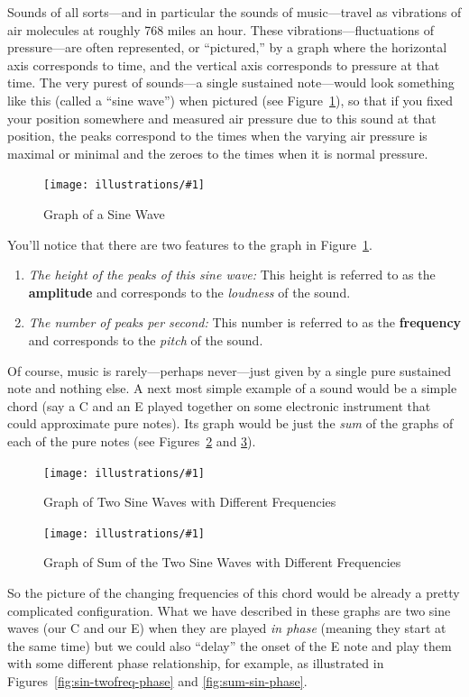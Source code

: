 \documentclass[openany]{book}
\newcommand{\ill}[3]{%
   \begin{figure}[H]%
   \vspace{-2ex}
   \centering%
   \texttt{[image: illustrations/\#1]}%
   \caption{#3}%
   \vspace{-2ex}
    \end{figure}}
\theoremstyle{plain}
\theoremstyle{definition}
\begin{document}
{{Sounds of all sorts---and in particular the sounds of music---travel
as vibrations of air molecules at roughly 768 miles an hour. These
vibrations---fluctuations of pressure---are often represented, or
``pictured,'' by a graph where the horizontal axis corresponds to
time, and the vertical axis corresponds to pressure at that time.  The
very purest of sounds---a single sustained note---would look
something like this (called a ``sine wave'') when pictured (see
Figure~\ref{fig:sine}), so that if you fixed your position somewhere
and measured air pressure due to this sound at that position, the
peaks correspond to the times when the varying air pressure is maximal
or minimal and the zeroes to the times when it is normal pressure.

\ill{sin}{.6}{Graph of a Sine Wave\label{fig:sine}}

You'll notice that there are two features to the graph in Figure~\ref{fig:sine}.

\begin{enumerate}
\item {\em The height of the peaks of this sine wave:} This height is
  referred to as the {\bf amplitude} and corresponds to the {\em
    loudness} of the sound.
\item {\em The number of peaks per second:} This number is referred to
  as the {\bf frequency} and corresponds to the {\em pitch} of the
  sound.
\end{enumerate}


Of course, music is rarely---perhaps never---just given by a single
pure sustained note and nothing else. A next most simple example of a
sound would be a simple chord (say a C and an E played together on
some electronic instrument that could approximate pure notes). Its
graph would be just the {\em sum} of the graphs of each of the pure
notes (see Figures~\ref{fig:sinetwofreq} and \ref{fig:sinetwofreqsum}).


\ill{sin-twofreq}{0.6}{Graph of Two Sine Waves with Different Frequencies\label{fig:sinetwofreq}}

\ill{sin-twofreq-sum}{.6}{Graph of Sum of the Two Sine Waves with Different Frequencies\label{fig:sinetwofreqsum}}

So the picture of the changing frequencies of this chord would be
already a pretty complicated configuration.  What we have described in
these graphs are two sine waves (our C and our E) when they are played
{\em in phase} (meaning they start at the same time) but we could
also ``delay'' the onset of the E note and play them with some
different phase relationship, for example, as illustrated
in Figures~\ref{fig:sin-twofreq-phase} and \ref{fig:sum-sin-phase}.

}}
\end{document}
